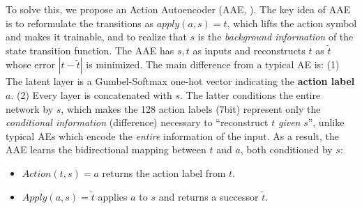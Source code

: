 \documentclass[10pt,letterpaper]{article}
\begin{document}
To solve this, we propose an Action Autoencoder (AAE, ). %
The key idea of AAE is to reformulate the transitions as $apply(a,s)=t$, which lifts the action symbol and makes it trainable,
and to realize that $s$ is the \emph{background information} of the state transition function.
The AAE has $s,t$ as inputs and reconstructs $t$ as $\tilde{t}$ whose error $|t-\tilde{t}|$ is minimized.
The main difference from a typical AE is:
(1) The latent layer is a Gumbel-Softmax one-hot vector indicating the \textbf{action label} $a$. %
(2) Every layer is concatenated with $s$.
The latter conditions the entire network by $s$,
which makes the 128 action labels (7bit) represent only the \emph{conditional information} (difference) necessary to ``reconstruct $t$ \emph{given} $s$'',
unlike typical AEs which encode the \emph{entire} information of the input.
% 
As a result, the AAE learns the bidirectional mapping between $t$ and $a$, both conditioned by $s$:
\begin{itemize}
\setlength{\itemsep}{-0.3em}
 \item $Action(t,s)=a$ returns the action label from $t$.
 \item $Apply(a,s)=\tilde{t}$ applies $a$ to $s$ and returns a successor $\tilde{t}$. 
\end{itemize}
\end{document}
